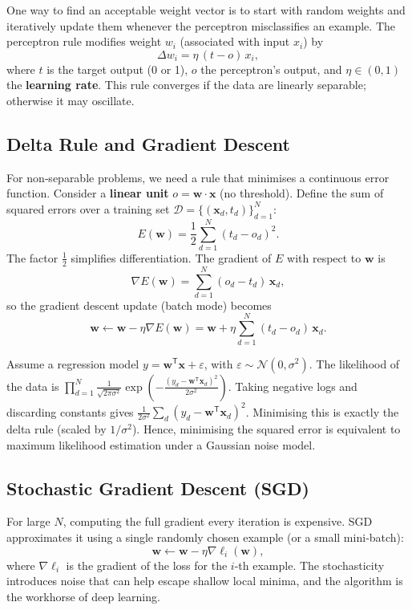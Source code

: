 \documentclass{tufte-handout}
\let\subsubsection\subsection
\begin{document}
One way to find an acceptable weight vector is to start with random weights and iteratively update them whenever the perceptron misclassifies an example. The perceptron rule modifies weight $w_i$ (associated with input $x_i$) by
\[
\Delta w_i = \eta\,(t - o)\,x_i,
\]
where $t$ is the target output (0 or 1), $o$ the perceptron’s output, and $\eta \in (0,1)$ the \textbf{learning rate}. This rule converges if the data are linearly separable; otherwise it may oscillate.

\subsubsection{Delta Rule and Gradient Descent}

For non‑separable problems, we need a rule that minimises a continuous error function. Consider a \textbf{linear unit} $o = \mathbf{w}\cdot\mathbf{x}$ (no threshold). Define the sum of squared errors over a training set $\mathcal{D} = \{(\mathbf{x}_d, t_d)\}_{d=1}^N$:
\[
E(\mathbf{w}) = \frac{1}{2}\sum_{d=1}^N (t_d - o_d)^2.
\]
The factor $\frac12$ simplifies differentiation. The gradient of $E$ with respect to $\mathbf{w}$ is
\[
\nabla E(\mathbf{w}) = \sum_{d=1}^N (o_d - t_d)\,\mathbf{x}_d,
\]
so the gradient descent update (batch mode) becomes
\[
\mathbf{w} \leftarrow \mathbf{w} - \eta \nabla E(\mathbf{w}) = \mathbf{w} + \eta \sum_{d=1}^N (t_d - o_d)\,\mathbf{x}_d.
\]

\begin{remark}
    Assume a regression model $y = \mathbf{w}^{\mathsf{T}}\mathbf{x} + \varepsilon$, with $\varepsilon \sim \mathcal{N}(0,\sigma^2)$. The likelihood of the data is $\prod_{d=1}^N \frac{1}{\sqrt{2\pi\sigma^2}}\exp\!\left(-\frac{(y_d - \mathbf{w}^{\mathsf{T}}\mathbf{x}_d)^2}{2\sigma^2}\right)$. Taking negative logs and discarding constants gives $\frac{1}{2\sigma^2}\sum_d (y_d - \mathbf{w}^{\mathsf{T}}\mathbf{x}_d)^2$. Minimising this is exactly the delta rule (scaled by $1/\sigma^2$). Hence, minimising the squared error is equivalent to maximum likelihood estimation under a Gaussian noise model.
\end{remark}

\subsubsection{Stochastic Gradient Descent (SGD)}

For large $N$, computing the full gradient every iteration is expensive. SGD approximates it using a single randomly chosen example (or a small mini‑batch):
\[
\mathbf{w} \leftarrow \mathbf{w} - \eta \nabla \ell_i(\mathbf{w}),
\]
where $\nabla \ell_i$ is the gradient of the loss for the $i$-th example. The stochasticity introduces noise that can help escape shallow local minima, and the algorithm is the workhorse of deep learning.
\end{document}
